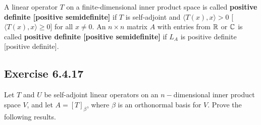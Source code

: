 \begin{definition}
    A linear operator \( T  \) on a finite-dimensional inner product space is called \textbf{positive definite [positive semidefinite]} if \( T  \) is self-adjoint and \( \langle T(x) , x \rangle > 0  \) [\( \langle T(x) , x \rangle \geq 0  \)] for all \( x \neq 0  \). 
    An \( n \times n  \) matrix \( A  \) with entries from \( \mathbb{R}  \) or \( \mathbb{C}  \) is called \textbf{positive definite [positive semidefinite]} if \( {L}_{A} \) is positive definite [positive definite].
\end{definition}

\subsection*{Exercise 6.4.17} Let \( T  \) and \( U  \) be self-adjoint linear operators on an \( n- \)dimensional inner product space \( V  \), and let \( A = [T]_{\beta} \), where \( \beta  \) is an orthonormal basis for \( V  \). Prove the following results.

